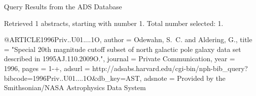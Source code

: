 Query Results from the ADS Database


Retrieved 1 abstracts, starting with number 1.  Total number selected: 1.

@ARTICLE{1996Priv..U01....1O,
   author = {{Odewahn}, S.~C. and {Aldering}, G.},
    title = "{Special 20th magnitude cutoff subset of north galactic pole galaxy data set described in 1995AJ.110.2009O.}",
  journal = {Private Communication},
     year = 1996,
    pages = {1-+},
   adsurl = {http://adsabs.harvard.edu/cgi-bin/nph-bib_query?bibcode=1996Priv..U01....1O&db_key=AST},
  adsnote = {Provided by the Smithsonian/NASA Astrophysics Data System}
}



